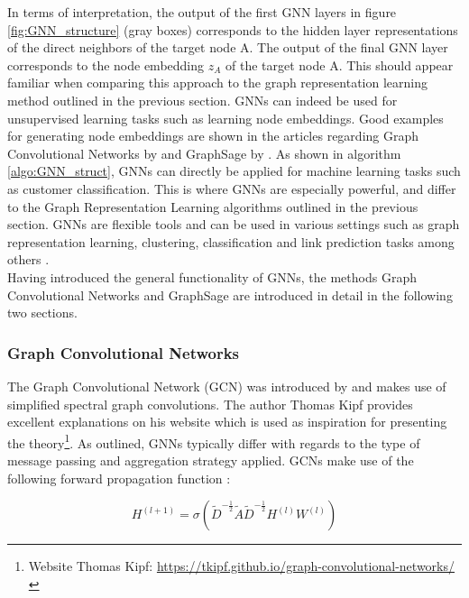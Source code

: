 	\noindent In terms of interpretation, the output of the first GNN layers in
	figure \ref{fig:GNN_structure} (gray boxes) corresponds to the hidden layer 
	representations of the direct neighbors of the target node A. The output of 
	the final GNN layer corresponds to the node embedding $z_{A}$ of the target 
	node A. This should appear familiar when comparing this approach to the graph 
	representation learning method outlined in the previous section. 
	GNNs can indeed be used for unsupervised learning tasks such as learning 
	node embeddings. Good examples for generating node embeddings are shown in 
	the articles regarding Graph Convolutional Networks by \cite{kipf2016semi} 
	and GraphSage by \cite{hamilton2017inductive}. As shown in algorithm 
	\ref{algo:GNN_struct}, GNNs can directly be applied for machine learning
	tasks such as customer classification. This is where GNNs are especially 
	powerful, and differ to the Graph Representation Learning algorithms 
	outlined in the previous section. GNNs are flexible tools and can be used 
	in various settings such as graph representation learning, clustering, 
	classification and link prediction tasks among others \citep{zhou2020graph}. \\

	\noindent Having introduced the general functionality of GNNs, the methods
	Graph Convolutional Networks and GraphSage are introduced in detail in the
	following two sections. 

	\subsubsection{Graph Convolutional Networks}
	
	\noindent The Graph Convolutional Network (GCN) was introduced by 
	\cite{kipf2016semi} and makes use of simplified spectral graph
	convolutions. The author Thomas Kipf \citeyearpar{kipf2016online} provides 
	excellent explanations on his website which is used as inspiration for
	presenting the theory\footnote{Website Thomas Kipf: 
	\url{https://tkipf.github.io/graph-convolutional-networks/}}. As outlined, 
	GNNs typically differ with regards to the type of message passing and 
	aggregation strategy applied. GCNs make use of the following forward 
	propagation function \citep[p. 2]{kipf2016semi}:

	\begin{equation}
		H^{(l+1)} = \sigma\left(\tilde D^{-\frac{1}{2}}\tilde A \tilde
		D^{-\frac{1}{2}}H^{(l)}W^{(l)}\right)
		\label{eq:GCN}
	\end{equation}
	
